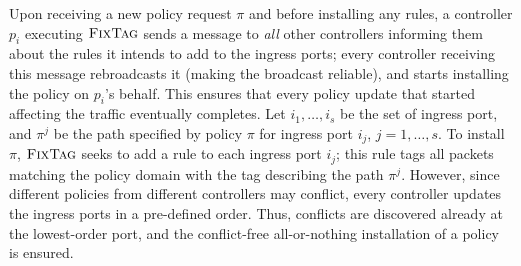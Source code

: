 \documentclass[11pt,pdftex,letter]{article}
\newcommand{\CPO}{\textsc{FixTag}}
\newcommand{\eg}{{\it e.g.}}
\begin{document}
Upon receiving a new policy request $\pi$ and before installing any rules,
a controller $p_i$ executing $\CPO$ sends a message to \emph{all}
other controllers
informing them about the rules it intends to add to the
ingress ports; every controller receiving this message
rebroadcasts it (making the broadcast reliable), and starts installing the policy on $p_i$'s behalf.
This ensures that every policy update that started affecting the
traffic eventually completes.
Let $i_1,\ldots,i_s$ be the set of ingress port, and $\pi^j$ be the
path specified by policy $\pi$ for ingress port $i_j$, $j=1,\ldots,s$.
To install $\pi$, $\CPO$ seeks to add a rule to each ingress port $i_j$; this rule tags all
packets matching the policy domain with the tag describing the path $\pi^j$.
However, since different policies from different controllers
may conflict, %
every controller updates the ingress ports in a pre-defined order.
Thus, conflicts are discovered already at the lowest-order port, and the conflict-free all-or-nothing installation of a policy
is ensured.
\end{document}
